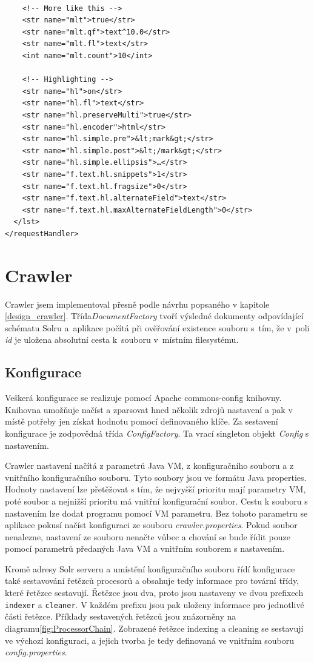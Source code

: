 \begin{verbatim}
    
    <!-- More like this -->
    <str name="mlt">true</str>
    <str name="mlt.qf">text^10.0</str>
    <str name="mlt.fl">text</str>
    <int name="mlt.count">10</int>
    
    <!-- Highlighting -->
    <str name="hl">on</str>
    <str name="hl.fl">text</str>
    <str name="hl.preserveMulti">true</str>
    <str name="hl.encoder">html</str>
    <str name="hl.simple.pre">&lt;mark&gt;</str>
    <str name="hl.simple.post">&lt;/mark&gt;</str>
    <str name="hl.simple.ellipsis">…</str>
    <str name="f.text.hl.snippets">1</str>
    <str name="f.text.hl.fragsize">0</str>
    <str name="f.text.hl.alternateField">text</str>
    <str name="f.text.hl.maxAlternateFieldLength">0</str>
  </lst>
</requestHandler>
\end{verbatim}

\section{Crawler}
Crawler jsem implementoval přesně podle návrhu popsaného v kapitole \ref{design_crawler}. Třída\emph{DocumentFactory} tvoří výsledné dokumenty odpovídající schématu Solru a~aplikace počítá při ověřování existence souboru s~tím, že v~poli \emph{id} je uložena absolutní cesta k~souboru v~místním filesystému.

\subsection{Konfigurace}
Veškerá konfigurace se realizuje pomocí Apache commons-config knihovny. Knihovna umožňuje načíst a zparsovat hned několik zdrojů nastavení a pak v místě potřeby jen získat hodnotu pomocí definovaného klíče. Za sestavení konfigurace je zodpovědná třída \emph{ConfigFactory}. Ta vrací singleton objekt \emph{Config} s nastavením.

Crawler nastavení načítá z parametrů Java VM, z konfiguračního souboru a z vnitřního konfiguračního souboru. Tyto soubory jsou ve formátu Java properties. Hodnoty nastavení lze přetěžovat s tím, že nejvyšší prioritu mají parametry VM, poté soubor a nejnižší prioritu má vnitřní konfigurační soubor. Cestu k souboru s nastavením lze dodat programu pomocí VM parametru. Bez tohoto parametru se aplikace pokusí načíst konfiguraci ze souboru \emph{crawler.properties}. Pokud soubor nenalezne, nastavení ze souboru nenačte vůbec a chování se bude řídit pouze pomocí parametrů předaných Java VM a vnitřním souborem s nastavením.

Kromě adresy Solr serveru a umístění konfiguračního souboru řídí konfigurace také sestavování  řetězců procesorů a obsahuje tedy informace pro tovární třídy, které řetězce sestavují. Řetězce jsou dva, proto jsou nastaveny ve dvou prefixech \verb|indexer| a \verb|cleaner|. V každém prefixu jsou pak uloženy informace pro jednotlivé části řetězce. Příklady sestavených řetězců jsou znázorněny na diagramu\ref{fig:ProcessorChain}. Zobrazené řetězce indexing a cleaning se sestavují ve výchozí konfiguraci, a jejich tvorba je tedy definovaná ve vnitřním souboru \emph{config.properties}.

